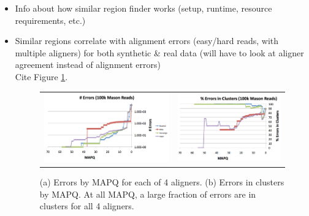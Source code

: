 \documentclass[10pt]{article}
\begin{document}
\begin{itemize}
\item{Info about how similar region finder works (setup, runtime, resource requirements, etc.)}
\item{Similar regions correlate with alignment errors (easy/hard reads, with multiple aligners) for both synthetic \& real data (will have to look at aligner agreement instead of alignment errors)}\\
Cite Figure \ref{fig:errorsInClustersGraph}.\\
\begin{figure}
\centering
\begin{tabular}{c c}
\includegraphics[scale=0.3]{errorsByMapq} & \includegraphics[scale=0.3]{errorsInClusters}
\end{tabular}
\caption{(a) Errors by MAPQ for each of 4 aligners.  (b) Errors in clusters by MAPQ.  At all MAPQ, a large fraction of errors are in clusters for all 4 aligners.}
\label{fig:errorsInClustersGraph}
\end{figure}

\end{itemize}
\end{document}
